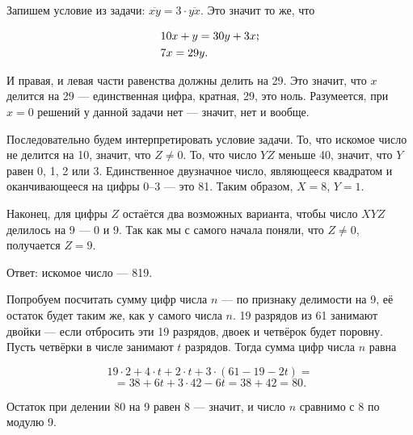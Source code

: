 \begin{itemize}

\itA Запишем условие из задачи: $\overline{xy} = 3 \cdot \overline{yx}$. Это значит то же, что

\vspace{-0.4cm}
\begin{align*}
& 10x + y = 30y + 3x\scolon \\
& 7x = 29y.
\end{align*}

И правая, и левая части равенства должны делить на 29. Это значит, что $x$ делится на 29 — единственная цифра, кратная, 29, это ноль. Разумеется, при $x=0$ решений у данной задачи нет — значит, нет и вообще.


\itB Последовательно будем интерпретировать условие задачи. То, что искомое число не делится на 10, значит, что $Z \ne 0$. То, что число $YZ$ меньше 40, значит, что $Y$ равен 0, 1, 2 или 3. Единственное двузначное число, являющееся квадратом и оканчивающееся на цифры 0–3 — это 81. Таким образом, $X=8$, $Y=1$.

Наконец, для цифры $Z$ остаётся два возможных варианта, чтобы число $XYZ$ делилось на 9 — 0 и 9. Так как мы с самого начала поняли, что $Z \ne 0$, получается $Z = 9$.

Ответ: искомое число — 819.

\itC Попробуем посчитать сумму цифр числа $n$ — по признаку делимости на 9, её остаток будет таким же, как у самого числа $n$. 19 разрядов из 61 занимают двойки — если отбросить эти 19 разрядов, двоек и четвёрок будет поровну. Пусть четвёрки в числе занимают $t$ разрядов. Тогда сумма цифр числа $n$ равна

\vspace{-0.4cm}
$$19 \cdot 2 + 4 \cdot t + 2 \cdot t + 3 \cdot (61 - 19 - 2t) =$$
$$= 38 + 6t + 3 \cdot 42 - 6t = 38 + 42 = 80.$$

Остаток при делении 80 на 9 равен 8 — значит, и число $n$ сравнимо с 8 по модулю 9.

\end{itemize}